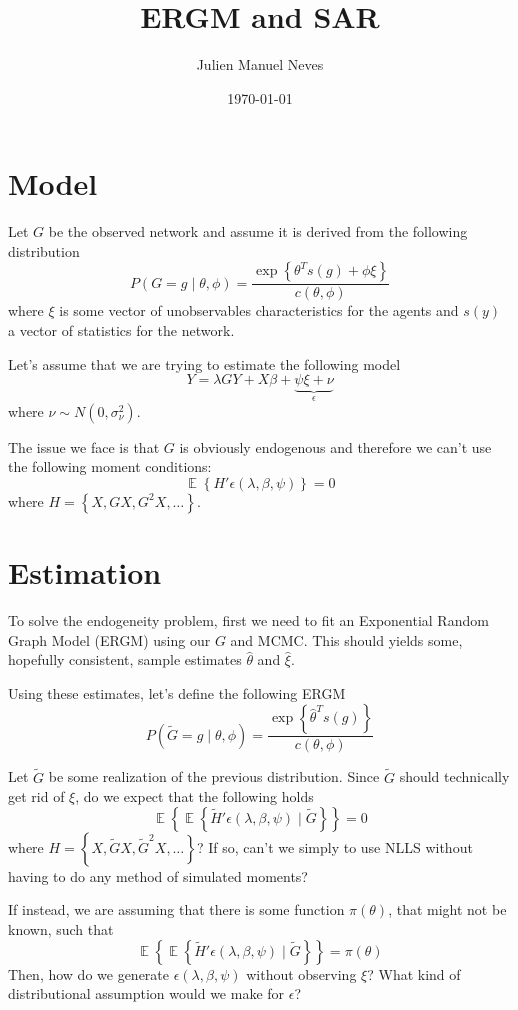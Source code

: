 \documentclass[12pt]{article}
\title{ERGM and SAR}
\date{\today}
\author{Julien Manuel Neves}
\newcommand{\1}{{\bf 1}} %
\DeclareMathOperator{\E}{\mathbb{E}} %
\newcommand{\Ex}[1]{\E\left\{#1\right\}} %
\newcommand{\cbra}[1]{\left\{ #1 \right\}}
\begin{document}
\maketitle

\section*{Model}

Let $G$ be the observed network and assume it is derived from the following distribution
\[P(G = g \mid \theta,\phi) = \frac{\exp\cbra{\theta^Ts(g) + \phi \xi}}{c(\theta,\phi)}\]
where $\xi$ is some vector of unobservables characteristics for the agents and $s(y)$ a vector of statistics for the network.

Let's assume that we are trying to estimate the following model
\[
	Y  = \lambda G Y + X\beta + \underbrace{\psi \xi + \nu}_{\epsilon}
\]
where $\nu\sim N(0,\sigma_\nu^2)$.

The issue we face is that $G$ is obviously endogenous and therefore we can't use the following moment conditions:
\[
\Ex{H'\epsilon(\lambda,\beta,\psi)} = 0
\]
where $H = \cbra{X, GX, G^2X, \dots}$.

\section*{Estimation}
To solve the endogeneity problem, first we need to fit an Exponential Random Graph Model (ERGM) using our $G$ and MCMC. This should yields some, hopefully consistent, sample estimates $\hat{\theta}$ and $\hat{\xi}$.

Using these estimates, let's define the following ERGM
\[P(\tilde{G} = g \mid \theta,\phi) = \frac{\exp\cbra{\hat{\theta}^Ts(g)}}{c(\theta,\phi)}\]

Let $\tilde{G}$ be some realization of the previous distribution. Since $\tilde{G}$ should technically get rid of $\xi$, do we expect that the following holds
\[
\Ex{\Ex{\tilde{H}'\epsilon(\lambda,\beta,\psi)\mid \tilde{G}}} = 0
\]
where $H = \cbra{X, \tilde{G}X, \tilde{G}^2X, \dots}$? If so, can't we simply to use NLLS without having to do any method of simulated moments?

If instead, we are assuming that there is some function $\pi(\theta)$, that might not be known, such that
\[
\Ex{\Ex{\tilde{H}'\epsilon(\lambda,\beta,\psi)\mid \tilde{G}}} = \pi(\theta)
\]
Then, how do we generate $\epsilon(\lambda,\beta,\psi)$ without observing $\xi$? What kind of distributional assumption would we make for $\epsilon$?
\end{document}
